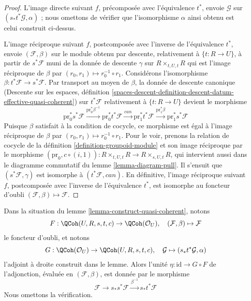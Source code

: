 \begin{proof}
\medskip\noindent
L'image directe suivant $f$, précomposée avec l'équivalence $t^*$, envoie $\mathcal{G}$ sur $(s_*t^*\mathcal{G}, \alpha)$ ; nous omettons de vérifier que l'isomorphisme $\alpha$ ainsi obtenu est celui construit ci-dessus.

\medskip\noindent
L'image réciproque suivant $f$, postcomposée avec l'inverse de l'équivalence $t^*$, envoie $(\mathcal{F}, \beta)$ sur le module obtenu par descente, relativement à $\{t : R \to U\}$, à partir de $s^*\mathcal{F}$ muni de la donnée de descente $\gamma$ sur $R \times_{t, U, t} R$ qui est l'image réciproque de $\beta$ par $(r_0, r_1) \mapsto r_0^{-1} \circ r_1$. Considérons l'isomorphisme $\beta : t^*\mathcal{F} \to s^*\mathcal{F}$. Par transport au moyen de $\beta$, la donnée de descente canonique (Descente sur les espaces, définition \ref{spaces-descent-definition-descent-datum-effective-quasi-coherent}) sur $t^*\mathcal{F}$ relativement à $\{t : R \to U\}$ devient le morphisme
$$
\text{pr}_0^*s^*\mathcal{F}
\xrightarrow{\text{pr}_0^*\beta^{-1}}
\text{pr}_0^*t^*\mathcal{F}
\xrightarrow{can}
\text{pr}_1^*t^*\mathcal{F}
\xrightarrow{\text{pr}_1^*\beta}
\text{pr}_1^*s^*\mathcal{F}
$$
Puisque $\beta$ satisfait à la condition de cocycle, ce morphisme est égal à l'image réciproque de $\beta$ par $(r_0, r_1) \mapsto r_0^{-1} \circ r_1$. Pour le voir, prenons la relation de cocycle de la définition \ref{definition-groupoid-module} et son image réciproque par le morphisme $(\text{pr}_0, c \circ (i, 1)) : R \times_{t, U, t} R \to R \times_{s, U, t} R$, qui intervient aussi dans le diagramme commutatif du lemme \ref{lemma-diagram-pull}. Il s'ensuit que $(s^*\mathcal{F}, \gamma)$ est isomorphe à $(t^*\mathcal{F}, can)$. En définitive, l'image réciproque suivant $f$, postcomposée avec l'inverse de l'équivalence $t^*$, est isomorphe au foncteur d'oubli $(\mathcal{F}, \beta) \mapsto \mathcal{F}$.
\end{proof}

\begin{remark}
\label{remark-adjunction-map}
Dans la situation du lemme \ref{lemma-construct-quasi-coherent}, notons
$$
F : \QCoh(U, R, s, t, c) \to \QCoh(\mathcal{O}_U),\quad
(\mathcal{F}, \beta) \mapsto \mathcal{F}
$$
le foncteur d'oubli, et notons
$$
G : \QCoh(\mathcal{O}_U) \to \QCoh(U, R, s, t, c),\quad
\mathcal{G} \mapsto (s_*t^*\mathcal{G}, \alpha)
$$
l'adjoint à droite construit dans le lemme. Alors l'unité $\eta : \text{id} \to G \circ F$ de l'adjonction, évaluée en $(\mathcal{F}, \beta)$, est donnée par le morphisme
$$
\mathcal{F} \to s_*s^*\mathcal{F} \xrightarrow{\beta^{-1}} s_*t^*\mathcal{F}
$$
Nous omettons la vérification.
\end{remark}

